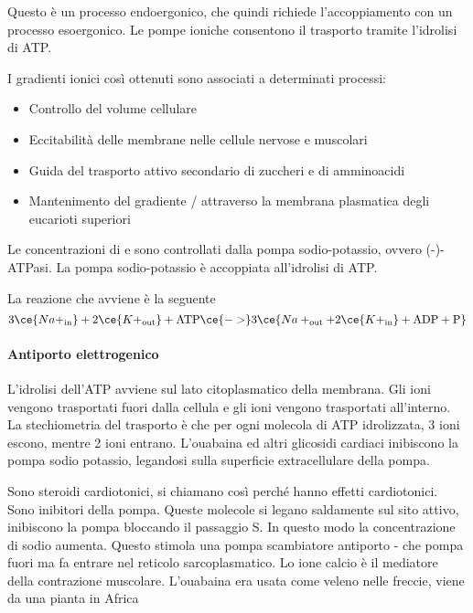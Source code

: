 Questo è un processo endoergonico, che quindi richiede l'accoppiamento con un processo esoergonico.
Le pompe ioniche consentono il trasporto tramite l'idrolisi di ATP.{}

I gradienti ionici così ottenuti sono associati a determinati processi:
\begin{itemize}
\item Controllo del volume cellulare
\item Eccitabilità delle membrane nelle cellule nervose e muscolari
\item Guida del trasporto attivo secondario di zuccheri e di amminoacidi
\item Mantenimento del gradiente / attraverso la membrana plasmatica degli eucarioti superiori
\end{itemize}

Le concentrazioni di  e  sono controllati dalla pompa sodio-potassio, ovvero (-)-ATPasi. La pompa sodio-potassio è accoppiata all'idrolisi di ATP.{}



La reazione che avviene è la seguente
\[
3 \ce{Na+_{\text{in}}} + 2 \ce{K+_{\text{out}}} + \text{ATP} \ce{->} 3 \ce {Na+_{\text{out}} + 2 \ce{K+_{\text{in}}} + \text{ADP} + \text{P}}
\]

\paragraph{Antiporto elettrogenico}


L'idrolisi dell'ATP avviene sul lato citoplasmatico della membrana. Gli ioni  vengono trasportati fuori dalla cellula e gli ioni  vengono trasportati all'interno. La stechiometria del trasporto è che per ogni molecola di ATP idrolizzata, 3 ioni  escono, mentre 2 ioni  entrano.
L'ouabaina ed altri glicosidi cardiaci inibiscono la pompa sodio potassio, legandosi sulla superficie extracellulare della pompa.

Sono steroidi cardiotonici, si chiamano così perché hanno effetti cardiotonici. Sono inibitori della pompa. Queste molecole si legano saldamente sul sito attivo, inibiscono la pompa bloccando il passaggio S. In questo modo la concentrazione di sodio aumenta. Questo stimola una pompa scambiatore antiporto - che pompa  fuori ma fa entrare  nel reticolo sarcoplasmatico. Lo ione calcio è il mediatore della contrazione muscolare.
L'ouabaina era usata come veleno nelle freccie, viene da una pianta in Africa

